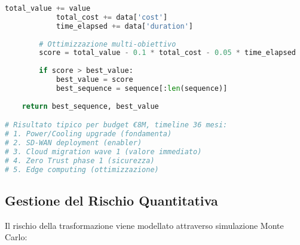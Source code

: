 \begin{lstlisting}[language=Python, caption=Ottimizzazione roadmap implementativa]
            total_value += value
            total_cost += data['cost']
            time_elapsed += data['duration']
            
        # Ottimizzazione multi-obiettivo
        score = total_value - 0.1 * total_cost - 0.05 * time_elapsed
        
        if score > best_value:
            best_value = score
            best_sequence = sequence[:len(sequence)]
            
    return best_sequence, best_value

# Risultato tipico per budget €8M, timeline 36 mesi:
# 1. Power/Cooling upgrade (fondamenta)
# 2. SD-WAN deployment (enabler)
# 3. Cloud migration wave 1 (valore immediato)
# 4. Zero Trust phase 1 (sicurezza)
# 5. Edge computing (ottimizzazione)
\end{lstlisting}

\subsection{Gestione del Rischio Quantitativa}

Il rischio della trasformazione viene modellato attraverso simulazione Monte Carlo:

